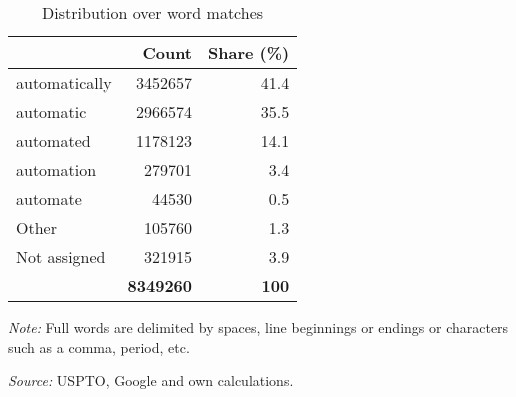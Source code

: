 \begin{table}
\begin{small}
\begin{threeparttable}
\caption{{\normalsize Distribution over word matches}}
\label{tab:word_distribution}
\begin{tabular}{lrr}
\toprule \addlinespace[0.5em]
 & \textbf{Count} & \textbf{Share (\%)}\tabularnewline[0.1cm]
\midrule \addlinespace[0.5em]
\textcolor{mymediumgray}{automat}ically & 3452657 & 41.4 \tabularnewline[0.1cm]
\textcolor{mymediumgray}{automat}ic & 2966574 & 35.5 \tabularnewline[0.1cm]
\textcolor{mymediumgray}{automat}ed & 1178123 & 14.1 \tabularnewline[0.1cm]
\textcolor{mymediumgray}{automat}ion & 279701 & 3.4 \tabularnewline[0.1cm]
\textcolor{mymediumgray}{automat}e & 44530 & 0.5 \tabularnewline[0.1cm]
Other & 105760 & 1.3 \tabularnewline[0.1cm]
Not assigned & 321915 & 3.9 \tabularnewline[0.1cm]
 & \textbf{8349260} & \textbf{100} \tabularnewline[0.1cm]
\bottomrule
\end{tabular}
\begin{tablenotes}
\small
\item \textit{Note:} Full words are delimited by spaces, line beginnings or endings or characters such as a comma, period, etc.
\item \textit{Source:} USPTO, Google and own calculations.
\end{tablenotes}
\end{threeparttable}
\end{small}
\end{table}
